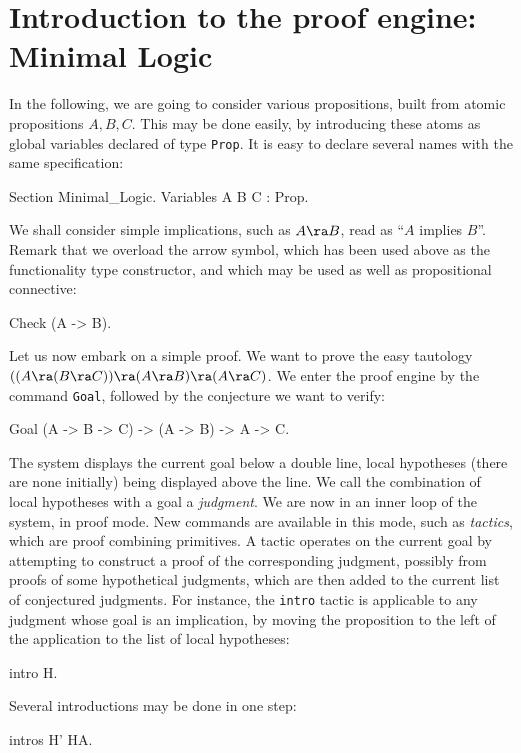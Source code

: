 \documentclass[11pt,a4paper]{book}
\begin{document}
\section{Introduction to the proof engine: Minimal Logic}

In the following, we are going to consider various propositions, built
from atomic propositions $A, B, C$. This may be done easily, by
introducing these atoms as global variables declared of type \verb:Prop:.
It is easy to declare several names with the same specification:
\begin{coq_example}
Section Minimal_Logic.
Variables A B C : Prop.
\end{coq_example}

We shall consider simple implications, such as $A\ra B$, read as 
``$A$ implies $B$''. Remark that we overload the arrow symbol, which
has been used above as the functionality type constructor, and which
may be used as well as propositional connective:
\begin{coq_example}
Check (A -> B).
\end{coq_example}

Let us now embark on a simple proof. We want to prove the easy tautology
$((A\ra (B\ra C))\ra (A\ra B)\ra (A\ra C)$. 
We enter the proof engine by the command
\verb:Goal:, followed by the conjecture we want to verify:
\begin{coq_example}
Goal (A -> B -> C) -> (A -> B) -> A -> C.
\end{coq_example}

The system displays the current goal below a double line, local hypotheses
(there are none initially) being displayed above the line. We call 
the combination of local hypotheses with a goal a {\sl judgment}.
We are now in an inner 
loop of the system, in proof mode. 
New commands are available in this
mode, such as {\sl tactics}, which are proof combining primitives.
A tactic operates on the current goal by attempting to construct a proof
of the corresponding judgment, possibly from proofs of some
hypothetical judgments, which are then added to the current
list of conjectured judgments.
For instance, the \verb:intro: tactic is applicable to any judgment
whose goal is an implication, by moving the proposition to the left
of the application to the list of local hypotheses:
\begin{coq_example}
intro H.
\end{coq_example}

Several introductions may be done in one step:
\begin{coq_example}
intros H' HA.
\end{coq_example}
\end{document}
